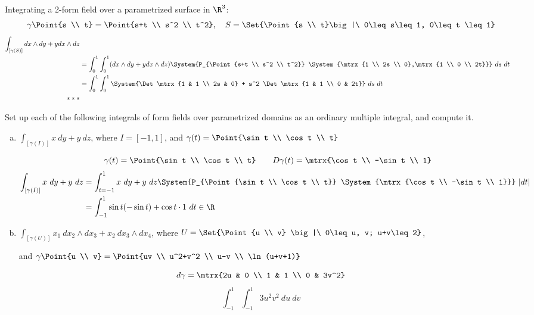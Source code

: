 Integrating a 2-form field over a parametrized surface in $\R^3$: 
\[ \gamma\Point{s \\ t} = \Point{s+t \\ s^2 \\ t^2},\quad S=\Set{\Point{s \\ t}\big|\ 0\leq s\leq 1, 0\leq t \leq 1}\]
\begin{align*}
	\int_{[\gamma(S)]}dx\land dy + y dx\land dz \\
	&= \int_0^1 \int_0^1 (dx\land dy + y dx\land dz) \System{P_{\Point{s+t \\ s^2 \\ t^2}} \System{\mtrx{1 \\ 2s \\ 0},\mtrx{1 \\ 0 \\ 2t}}}\ ds\ dt \\
	&= \int_0^1 \int_0^1 \System{\Det \mtrx{1 & 1 \\ 2s & 0} + s^2 \Det\mtrx{1 & 1 \\ 0 & 2t}}\ ds\ dt \\
	***
\end{align*}

 Set up each of the following integrals of form fields over parametrized domains as an ordinary multiple integral, and compute it. 
\begin{enumerate}[a.]
	\item $\int_{[\gamma(I)]}x\ dy + y\ dz$, where $I=[-1,1]$, and $\gamma(t) = \Point{\sin t \\ \cos t \\ t}$
	
	\[\gamma(t) = \Point{\sin t \\ \cos t \\ t} \qquad D\gamma(t) = \mtrx{\cos t \\ -\sin t \\ 1}\]
	\begin{align*}
	\int_{[\gamma(I)]}x\ dy + y\ dz &= \int_{t=-1}^{1} x\ dy + y\ dz\System{P_{\Point{\sin t \\ \cos t \\ t}} \System{\mtrx{\cos t \\ -\sin t \\ 1}}}\ |dt| \\
	&=\int_{-1}^1 \sin t(-\sin t)+\cos t\cdot 1\ dt \in \R	
	\end{align*}
	
	\item $\int_{[\gamma(U)]}x_1\ dx_2\land dx_3 + x_2\ dx_3\land dx_4$, where $U=\Set{\Point{u \\ v} \big|\ 0\leq u, v; u+v\leq 2}$, 

	and $\gamma\Point{u \\ v} = \Point{uv \\ u^2+v^2 \\ u-v \\ \ln(u+v+1)}$


\end{enumerate}


\[d\gamma = \mtrx{2u & 0 \\ 1 & 1 \\ 0 & 3v^2}\]
\[\int_{-1}^1 \int_{-1}^1 3u^2v^2\ du\ dv\]